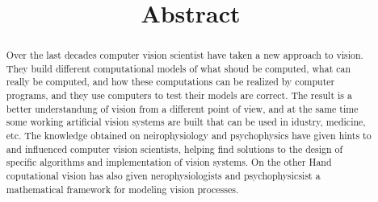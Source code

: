 \begin{abstract}
 
 \title{Abstract}
 
 Over the last decades computer vision scientist have taken a new approach to vision. They build different computational models of what shoud be computed, what can really be computed, and how these computations can be realized by computer programs, and they use computers to test their models are correct. The result is a better understandung of vision from a different point of view, and at the same time some working artificial vision systems are built that can be used in idustry, medicine, etc. The knowledge obtained on neirophysiology and psychophysics have given hints to and influenced computer vision scientists, helping find solutions to the design of specific algorithms and implementation of vision systems. On the other Hand coputational vision has also given nerophysiologists and psychophysicsist a mathematical framework for modeling vision processes.\cite{ZZGXr}
\end{abstract}